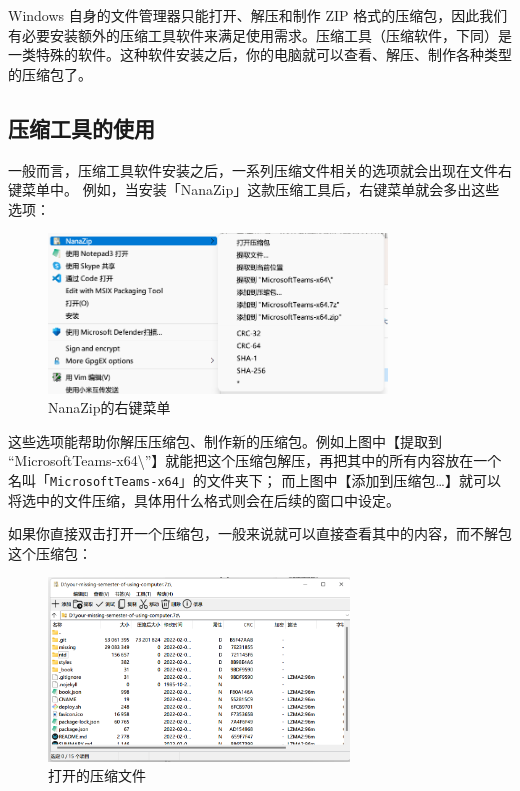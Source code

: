 Windows 自身的文件管理器只能打开、解压和制作 ZIP 格式的压缩包，因此我们有必要安装额外的压缩工具软件来满足使用需求。压缩工具（压缩软件，下同）是一类特殊的软件。这种软件安装之后，你的电脑就可以查看、解压、制作各种类型的压缩包了。

\subsection{压缩工具的使用}

一般而言，压缩工具软件安装之后，一系列压缩文件相关的选项就会出现在文件右键菜单中。
例如，当安装「NanaZip」这款压缩工具后，右键菜单就会多出这些选项：

\begin{figure}[htb!]
  \centering
  \includegraphics[width=9cm]{assets/Nanazip_Right_Click.png}
  \caption{NanaZip的右键菜单}
  \label{Nanazip_Right_Click}
\end{figure}

这些选项能帮助你解压压缩包、制作新的压缩包。例如上图中【提取到 “MicrosoftTeams-x64\textbackslash ”】就能把这个压缩包解压，再把其中的所有内容放在一个名叫「\verb|MicrosoftTeams-x64|」的文件夹下；
而上图中【添加到压缩包…】就可以将选中的文件压缩，具体用什么格式则会在后续的窗口中设定。

如果你直接双击打开一个压缩包，一般来说就可以直接查看其中的内容，而不解包这个压缩包：

\begin{figure}[htb!]
  \centering
  \includegraphics[width=8cm]{assets/Nanazip_View.png}
  \caption{打开的压缩文件}
  \label{Nanazip_View}
\end{figure}

